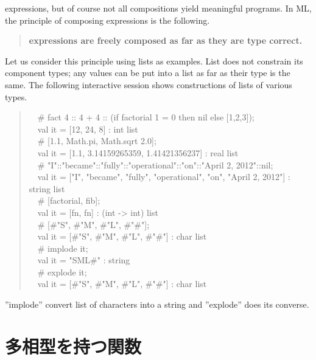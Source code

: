 \documentclass{jbook}
\newcommand{\txt}[2]{#1}
\newcommand{\myem}{\mbox{\ \ }}
\begin{document}
expressions, but of course not all compositions yield meaningful
programs.
	In ML, the principle of composing expressions is the following.
\begin{quote}
{\bf expressions are freely composed as far as they are type correct.}
\end{quote}
	Let us consider this principle using lists as examples.
	List does not constrain its component types; any values can be
put into a list as far as their type is the same.
	The following interactive session shows constructions of lists
of various types.
\begin{tt}
\begin{quote}
\myem \# fact 4 :: 4 + 4 :: (if factorial 1 = 0 then nil else [1,2,3]);
\\\myem  val it = [12, 24, 8] : int list
\\\myem   \# [1.1, Math.pi, Math.sqrt 2.0];
\\\myem   val it = [1.1, 3.14159265359, 1.41421356237] : real list
\\\myem   \# "I"::"became"::"fully"::"operational"::"on"::"April 2, 2012"::nil;
\\\myem   val it = ["I", "became", "fully", "operational", "on", "April 2, 2012"] : string list
\\\myem   \# [factorial, fib];
\\\myem   val it = [fn, fn] : (int  -> int) list
\\\myem   \# [\#"S", \#"M", \#"L", \#"\#"];
\\\myem   val it = [\#"S", \#"M", \#"L", \#"\#"] : char list
\\\myem   \# implode it;
\\\myem   val it = "SML\#" : string
\\\myem   \# explode it;
\\\myem   val it = [\#"S", \#"M", \#"L", \#"\#"] : char list
\end{quote}
\end{tt}
''implode'' convert list of characters into a string and ''explode''
does its converse.
\fi%

\section{\txt{多相型を持つ関数}{Polymorphic functions}}
\label{sec:tutorialPolymorphicfunction}
\end{document}
